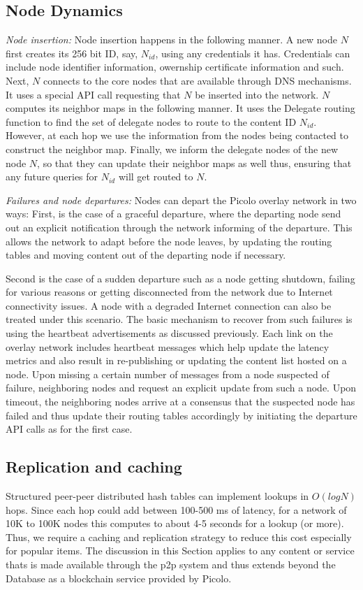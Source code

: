 \subsection{Node Dynamics}
\label{net:node_dynamics}

{\em Node insertion:} Node insertion happens in the following manner. A new node \(N\) first creates its 256 bit ID,
say, \(N_{id}\), using any credentials it has. Credentials can include node identifier information, owernship certificate information and
such. Next, \( N \) connects to the core nodes that are available through DNS mechanisms. It uses a special API call
requesting that \(N\) be inserted into the network. \(N\) computes its neighbor maps in the following manner. It uses
the Delegate routing function to find the set of delegate nodes to route to the content ID \(N_{id}\). However, at each
hop we use the information from the nodes being contacted to construct the neighbor map. Finally, we inform the delegate
nodes of the new node \(N\), so that they can update their neighbor maps as well thus, ensuring that any future queries
for \(N_{id}\) will get routed to \(N\). 

{\em Failures and node departures:} Nodes can depart the Picolo overlay network in two ways: First, is the case of a
graceful departure, where the departing node send out an explicit notification through the network informing of the
departure. This allows the network to adapt before the node leaves, by updating the routing tables and moving content
out of the departing node if necessary.

Second is the case of a sudden departure such as a node getting shutdown, failing for various reasons or getting
disconnected from the network due to Internet connectivity issues. A node with a degraded Internet connection can also
be treated under this scenario. The basic mechanism to recover from such failures is using the heartbeat advertisements
as discussed previously. Each link on the overlay network includes heartbeat messages which help update the latency
metrics and also result in re-publishing or updating the content list hosted on a node. Upon missing a certain number of
messages from a node suspected of failure, neighboring nodes and request an explicit update from such a node. Upon
timeout, the neighboring nodes arrive at a consensus that the suspected node has failed and thus update their routing
tables accordingly by initiating the departure API calls as for the first case.

\subsection{Replication and caching}
\label{net:replication}
Structured peer-peer distributed hash tables can implement lookups in \( O(log N)\) hops. Since each hop could add between 100-500
ms of latency, for a network of 10K to 100K nodes this computes to about 4-5 seconds for a lookup (or more). Thus, we
require a caching and replication strategy to reduce this cost especially for popular items. The discussion in this
Section applies to any content or service thats is made available through the p2p system and thus extends beyond the
Database as a blockchain service provided by Picolo.

